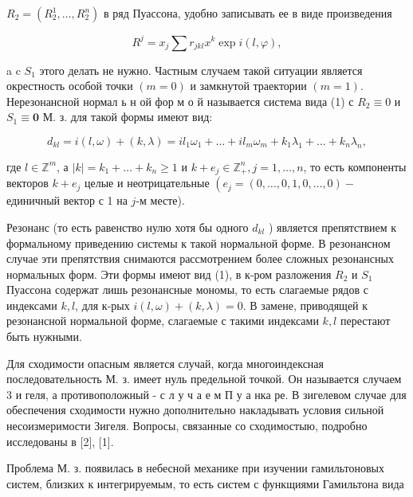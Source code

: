 \documentclass[10pt]{article}
\begin{document}
$R_{2}=\left(R_{2}^{1}, \ldots, R_{2}^{n}\right)$ в ряд Пуассона, удобно записывать ее в виде произведения



\[

R^{j}=x_{j} \sum r_{j k l} x^{k} \exp i(l, \varphi),

\]



a c $S_{1}$ этого делать не нужно. Частным случаем такой ситуации является окрестность особой точки $(m=0)$ и замкнутой траектории $(m=1)$. Нерезонансной нормал ь н ой фор м о й называется система вида (1) с $R_{2} \equiv 0$ и $S_{1} \equiv \mathbf{0}$ М. з. для такой формы имеют вид:



\[

d_{k l}=i(l, \omega)+(k, \lambda)=i l_{1} \omega_{1}+\ldots+i l_{m} \omega_{m}+k_{1} \lambda_{1}+\ldots+k_{n} \lambda_{n},

\]



где $l \in \mathbb{Z}^{m}$, а $|k|=k_{1}+\ldots+k_{n} \geqslant 1$ и $k+e_{j} \in \mathbb{Z}_{+}^{n}, j=1, \ldots, n$, то есть компоненты векторов $k+e_{j}$ целые и неотрицательные $\left(e_{j}=(0, \ldots, 0,1,0, \ldots, 0)-\right.$ единичный вектор с 1 на $j$-м месте).



Резонанс (то есть равенство нулю хотя бы одного $d_{k l}$ ) является препятствием к формальному приведению системы к такой нормальной форме. В резонансном случае эти препятствия снимаются рассмотрением более сложных резонансных нормальных форм. Эти формы имеют вид (1), в к-ром разложения $R_{2}$ и $S_{1}$ Пуассона содержат лишь резонансные мономы, то есть слагаемые рядов с индексами $k, l$, для к-рых $i(l, \omega)+(k, \lambda)=0$. В замене, приводящей к резонансной нормальной форме, слагаемые с такими индексами $k, l$ перестают быть нужными.



Для сходимости опасным является случай, когда многоиндексная последовательность М. з. имеет нуль предельной точкой. Он называется случаем 3 и геля, а противоположный - с л у ч а е м П у а нка ре. В зигелевом случае для обеспечения сходимости нужно дополнительно накладывать условия сильной несоизмеримости Зигеля. Вопросы, связанные со сходимостыю, подробно исследованы в [2], [1].



Проблема М. з. появилась в небесной механике при изучении гамильтоновых систем, близких к интегрируемым, то есть систем с функщиями Гамильтона вида
\end{document}
